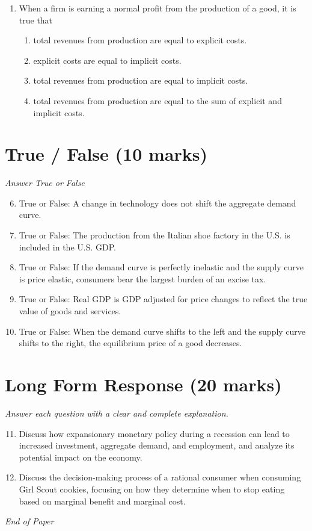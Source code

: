 \documentclass[12pt]{article}
\begin{document}
\begin{enumerate}[label=\arabic*.]
\begin{enumerate}[label=(\alph*)]
    \item Exports from the United States will increase.
    \item U.S. residents will take more vacations in foreign countries.
    \item More foreign visitors will travel to the United States.
\end{enumerate}
\item When a firm is earning a normal profit from the production of a good, it is true that
\begin{enumerate}[label=(\alph*)]
    \item total revenues from production are equal to explicit costs.
    \item explicit costs are equal to implicit costs.
    \item total revenues from production are equal to implicit costs.
    \item total revenues from production are equal to the sum of explicit and implicit costs.
\end{enumerate}
\end{enumerate}

\section*{True / False (10 marks)}
\textit{Answer True or False}
\begin{enumerate}[label=\arabic*.]
\setcounter{enumi}{5}
\item True or False: A change in technology does not shift the aggregate demand curve.
\item True or False: The production from the Italian shoe factory in the U.S. is included in the U.S. GDP.
\item True or False: If the demand curve is perfectly inelastic and the supply curve is price elastic, consumers bear the largest burden of an excise tax.
\item True or False: Real GDP is GDP adjusted for price changes to reflect the true value of goods and services.
\item True or False: When the demand curve shifts to the left and the supply curve shifts to the right, the equilibrium price of a good decreases.
\end{enumerate}

\section*{Long Form Response (20 marks)}
\textit{Answer each question with a clear and complete explanation.}
\begin{enumerate}[label=\arabic*.]
\setcounter{enumi}{10}
\item Discuss how expansionary monetary policy during a recession can lead to increased investment, aggregate demand, and employment, and analyze its potential impact on the economy.
\item Discuss the decision-making process of a rational consumer when consuming Girl Scout cookies, focusing on how they determine when to stop eating based on marginal benefit and marginal cost.
\end{enumerate}

\vfill
\noindent\textit{End of Paper}
\end{document}
